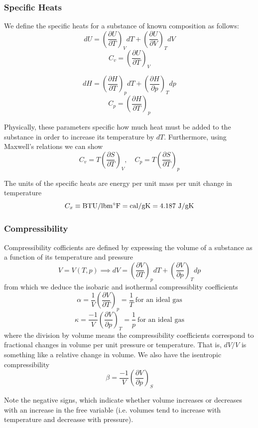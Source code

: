 \documentclass[11pt]{article}
\newcommand{\Partial}[2]{\frac{\partial #1}{\partial #2}}
\newcommand{\PartialConst}[3]{\left(\Partial{#1}{#2}\right)_{#3}}
\begin{document}
\subsubsection{Specific Heats}
We define the specific heats for a substance of known composition as follows:
$$dU = \PartialConst{U}{T}{V}dT + \PartialConst{U}{V}{T}dV$$
$$C_v = \PartialConst{U}{T}{V}$$

$$dH = \PartialConst{H}{T}{p}dT + \PartialConst{H}{p}{T}dp$$
$$C_p = \PartialConst{H}{T}{p}$$

Physically, these parameters specific how much heat must be added to the substance in order to increase its temperature by $dT$. Furthermore, using Maxwell's relations we can show
$$C_v = T\PartialConst{S}{T}{V},\quad C_p = T\PartialConst{S}{T}{p}$$

The units of the specific heats are energy per unit mass per unit change in temperature
$$C_x \equiv \mathrm{BTU/lbm \degree F} = \mathrm{cal/gK} = 4.187\ \mathrm{J/gK}$$

\subsubsection{Compressibility}
Compressibility cofficients are defined by expressing the volume of a substance as a function of its temperature and pressure
$$V= V(T,p)\implies dV = \PartialConst{V}{T}{p}dT + \PartialConst{V}{p}{T}dp$$
from which we deduce the isobaric and isothermal compressiblity coefficients
$$\alpha = \frac{1}{V}\PartialConst{V}{T}{p} = \frac{1}{T}\ \textrm{for an ideal gas}$$
$$\kappa = \frac{-1}{V}\PartialConst{V}{p}{T} = \frac{1}{p}\ \textrm{for an ideal gas}$$
where the division by volume means the compressibility coefficients correspond to fractional changes in volume per unit pressure or temperature. That is, $dV/V$ is something like a relative change in volume. We also have the isentropic compressibility
$$\beta=\frac{-1}{V}\PartialConst{V}{p}{S}$$

Note the negative signs, which indicate whether volume increases or decreases with an increase in the free variable (i.e. volumes tend to increase with temperature and decreasse with pressure).
\end{document}
